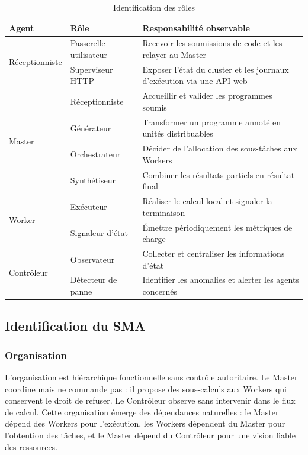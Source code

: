 \documentclass[12pt,a4paper]{report}
\begin{document}
\begin{table}[H]
\centering
\renewcommand{\arraystretch}{1.3}
\begin{tabular}{|l|l|l|}
\hline
\textbf{Agent} & \textbf{Rôle} & \textbf{Responsabilité observable} \\
\hline
\multirow{2}{*}{Réceptionniste} & Passerelle utilisateur & Recevoir les soumissions de code et les relayer au Master \\
 & Superviseur HTTP & Exposer l'état du cluster et les journaux d'exécution via une API web \\
\hline
\multirow{4}{*}{Master} & Réceptionniste & Accueillir et valider les programmes soumis \\
 & Générateur & Transformer un programme annoté en unités distribuables \\
 & Orchestrateur & Décider de l'allocation des sous-tâches aux Workers \\
 & Synthétiseur & Combiner les résultats partiels en résultat final \\
\hline
\multirow{2}{*}{Worker} & Exécuteur & Réaliser le calcul local et signaler la terminaison \\
 & Signaleur d'état & Émettre périodiquement les métriques de charge \\
\hline
\multirow{2}{*}{Contrôleur} & Observateur & Collecter et centraliser les informations d'état \\
 & Détecteur de panne & Identifier les anomalies et alerter les agents concernés \\
\hline
\end{tabular}
\caption{Identification des rôles}
\label{tab:identification_roles}
\end{table}

\subsection{Identification du SMA}

\subsubsection{Organisation}

L'organisation est hiérarchique fonctionnelle sans contrôle autoritaire. Le Master coordine mais ne commande pas : il propose des sous-calculs aux Workers qui conservent le droit de refuser. Le Contrôleur observe sans intervenir dans le flux de calcul. Cette organisation émerge des dépendances naturelles : le Master dépend des Workers pour l'exécution, les Workers dépendent du Master pour l'obtention des tâches, et le Master dépend du Contrôleur pour une vision fiable des ressources.
\end{document}
